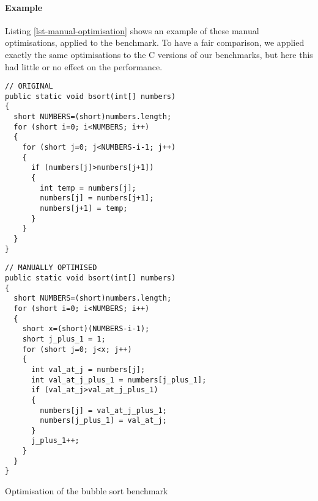 \paragraph{Example} Listing \ref{lst-manual-optimisation} shows an example of these manual optimisations, applied to the  benchmark. To have a fair comparison, we applied exactly the same optimisations to the C versions of our benchmarks, but here this had little or no effect on the performance.

\begin{listing}
\centering

\begin{minipage}[t]{0.47\textwidth}
\centering
  \begin{verbatim}
// ORIGINAL
public static void bsort(int[] numbers)
{
  short NUMBERS=(short)numbers.length;
  for (short i=0; i<NUMBERS; i++)
  {
    for (short j=0; j<NUMBERS-i-1; j++)
    {
      if (numbers[j]>numbers[j+1])
      {
        int temp = numbers[j];
        numbers[j] = numbers[j+1];
        numbers[j+1] = temp;
      }
    }
  }
}
\end{verbatim}
\end{minipage}
\hfill
\begin{minipage}[t]{0.52\textwidth}
\centering
\begin{verbatim}
// MANUALLY OPTIMISED
public static void bsort(int[] numbers)
{
  short NUMBERS=(short)numbers.length;
  for (short i=0; i<NUMBERS; i++)
  {
    short x=(short)(NUMBERS-i-1);
    short j_plus_1 = 1;
    for (short j=0; j<x; j++)
    {
      int val_at_j = numbers[j];
      int val_at_j_plus_1 = numbers[j_plus_1];
      if (val_at_j>val_at_j_plus_1)
      {
        numbers[j] = val_at_j_plus_1;
        numbers[j_plus_1] = val_at_j;
      }
      j_plus_1++;
    }
  }
}
\end{verbatim}
\end{minipage}
\caption{Optimisation of the bubble sort benchmark}
\label{lst-manual-optimisation}
\end{listing}


